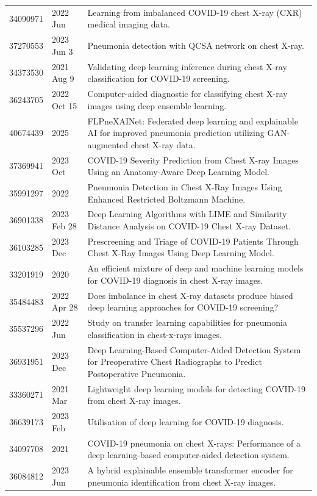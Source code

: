 \begin{longtable}{llp{9.5cm}}
34090971 & 2022 Jun & Learning from imbalanced COVID-19 chest X-ray (CXR) medical imaging data. \\
37270553 & 2023 Jun 3 & Pneumonia detection with QCSA network on chest X-ray. \\
34373530 & 2021 Aug 9 & Validating deep learning inference during chest X-ray classification for COVID-19 screening. \\
36243705 & 2022 Oct 15 & Computer-aided diagnostic for classifying chest X-ray images using deep ensemble learning. \\
40674439 & 2025 & FLPneXAINet: Federated deep learning and explainable AI for improved pneumonia prediction utilizing GAN-augmented chest X-ray data. \\
37369941 & 2023 Oct & COVID-19 Severity Prediction from Chest X-ray Images Using an Anatomy-Aware Deep Learning Model. \\
35991297 & 2022 & Pneumonia Detection in Chest X-Ray Images Using Enhanced Restricted Boltzmann Machine. \\
36901338 & 2023 Feb 28 & Deep Learning Algorithms with LIME and Similarity Distance Analysis on COVID-19 Chest X-ray Dataset. \\
36103285 & 2023 Dec & Prescreening and Triage of COVID-19 Patients Through Chest X-Ray Images Using Deep Learning Model. \\
33201919 & 2020 & An efficient mixture of deep and machine learning models for COVID-19 diagnosis in chest X-ray images. \\
35484483 & 2022 Apr 28 & Does imbalance in chest X-ray datasets produce biased deep learning approaches for COVID-19 screening? \\
35537296 & 2022 Jun & Study on transfer learning capabilities for pneumonia classification in chest-x-rays images. \\
36931951 & 2023 Dec & Deep Learning-Based Computer-Aided Detection System for Preoperative Chest Radiographs to Predict Postoperative Pneumonia. \\
33360271 & 2021 Mar & Lightweight deep learning models for detecting COVID-19 from chest X-ray images. \\
36639173 & 2023 Feb & Utilisation of deep learning for COVID-19 diagnosis. \\
34097708 & 2021 & COVID-19 pneumonia on chest X-rays: Performance of a deep learning-based computer-aided detection system. \\
36084812 & 2023 Jun & A hybrid explainable ensemble transformer encoder for pneumonia identification from chest X-ray images. \\

\end{longtable}
